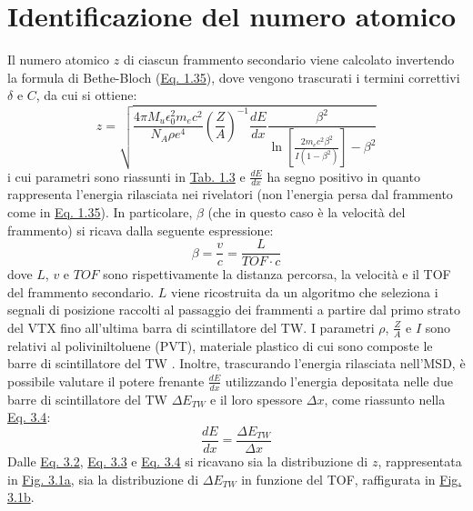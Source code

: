 \documentclass[12pt,a4paper,twoside]{report}
\begin{document}
	\section{Identificazione del numero atomico}
	Il numero atomico $z$ di ciascun frammento secondario viene calcolato invertendo la formula di Bethe-Bloch (\hyperref[eq:bethe_bloch]{Eq. 1.35}), dove vengono trascurati i termini correttivi $\delta$ e $C$, da cui si ottiene:
	\begin{equation}
		z=\sqrt{\frac{4\pi M_u\epsilon_0^2m_ec^2}{N_A\rho e^4}\left(\frac{Z}{A}\right)^{-1}\frac{dE}{dx}\frac{\beta^2}{\ln{\left[\frac{2m_ec^2\beta^2}{I\left(1-\beta^2\right)}\right]}-\beta^2}}
		\label{eq:atomic_number}
	\end{equation}
	i cui parametri sono riassunti in \hyperref[tab:bethe_bloch]{Tab. 1.3} e $\frac{dE}{dx}$ ha segno positivo in quanto rappresenta l'energia rilasciata nei rivelatori (non l'energia persa dal frammento come in \hyperref[eq:bethe_bloch]{Eq. 1.35}). In particolare, $\beta$ (che in questo caso è la velocità del frammento) si ricava dalla seguente espressione:
	\begin{equation}
		\beta=\frac{v}{c}=\frac{L}{TOF\cdot c}
		\label{eq:beta_beam}
	\end{equation}
	dove $L$, $v$ e $TOF$ sono rispettivamente la distanza percorsa, la velocità e il TOF del frammento secondario. $L$ viene ricostruita da un algoritmo che seleziona i segnali di posizione raccolti al passaggio dei frammenti a partire dal primo strato del VTX fino all'ultima barra di scintillatore del TW. I parametri $\rho$, $\frac{Z}{A}$ e $I$ sono relativi al poliviniltoluene (PVT), materiale plastico di cui sono composte le barre di scintillatore del TW \cite{pvt}. Inoltre, trascurando l'energia rilasciata nell'MSD, è possibile valutare il potere frenante $\frac{dE}{dx}$ utilizzando l'energia depositata nelle due barre di scintillatore del TW $\Delta E_{TW}$ e il loro spessore $\Delta x$, come riassunto nella \hyperref[eq:stopping_power]{Eq. 3.4}:
	\begin{equation}
		\frac{dE}{dx}=\frac{\Delta E_{TW}}{\Delta x}
		\label{eq:stopping_power}
	\end{equation}
	Dalle \hyperref[eq:atomic_number]{Eq. 3.2}, \hyperref[eq:beta_beam]{Eq. 3.3} e \hyperref[eq:stopping_power]{Eq. 3.4} si ricavano sia la distribuzione di $z$, rappresentata in \hyperref[fig:atomic_numbersa]{Fig. 3.1a}, sia la distribuzione di $\Delta E_{TW}$ in funzione del TOF, raffigurata in \hyperref[fig:atomic_numbersb]{Fig. 3.1b}.
\end{document}
